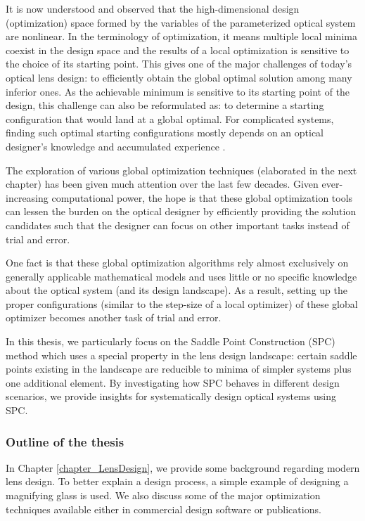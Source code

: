 It is now understood and observed that the high-dimensional design (optimization) space formed by the variables of the parameterized optical system are nonlinear. In the terminology of optimization, it means multiple local minima coexist in the design space and the results of a local optimization is sensitive to the choice of its starting point. This gives one of the major challenges of today's optical lens design: to efficiently obtain the global optimal solution among many inferior ones. As the achievable minimum is sensitive to its starting point of the design, this challenge can also be reformulated as: to determine a starting configuration that would land at a global optimal. For complicated systems, finding such optimal starting configurations mostly depends on an optical designer's knowledge and accumulated experience \cite{LivshitsQA2013}\cite{Shafer1995_moreless}. 

The exploration of various global optimization techniques (elaborated in the next chapter) has been given much attention over the last few decades. Given ever-increasing computational power, the hope is that these global optimization tools can lessen the burden on the optical designer by efficiently providing the solution candidates such that the designer can focus on other important tasks instead of trial and error. 

One fact is that these global optimization algorithms rely almost exclusively on generally applicable mathematical models and uses little or no specific knowledge about the optical system (and its design landscape). As a result, setting up the proper configurations (similar to the step-size of a local optimizer) of these global optimizer becomes another task of trial and error. 

In this thesis, we particularly focus on the Saddle Point Construction (SPC) method which uses a special property in the lens design landscape: certain saddle points existing in the landscape are reducible to minima of simpler systems plus one additional element. By investigating how SPC behaves in different design scenarios, we provide insights for systematically design optical systems using SPC. 



\subsubsection{Outline of the thesis}
In Chapter \ref{chapter_LensDesign}, we provide some background regarding modern lens design. To better explain a design process, a simple example of designing a magnifying glass is used. We also discuss some of the major optimization techniques available either in commercial design software or publications. 

